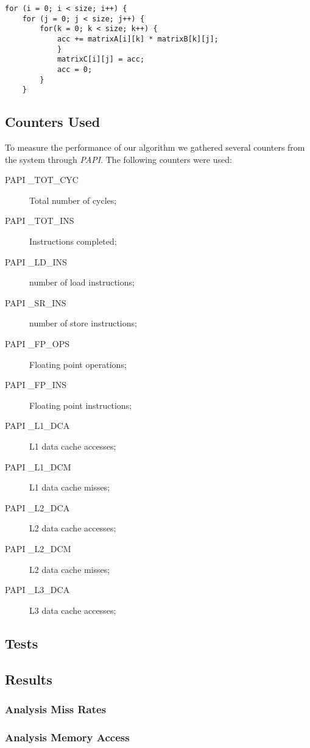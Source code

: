 \documentclass[a4paper,10pt,openright,openbib]{article}
\begin{document}
\begin{verbatim}
for (i = 0; i < size; i++) {
    for (j = 0; j < size; j++) {
        for(k = 0; k < size; k++) {
            acc += matrixA[i][k] * matrixB[k][j];				
            }		
            matrixC[i][j] = acc;	
            acc = 0;
        }
    }
\end{verbatim}

\subsection{Counters Used}
To measure the performance of our algorithm we gathered several counters from the system through \emph{PAPI}.
The following counters were used:
\begin{description}
\item[PAPI \_TOT\_CYC] Total number of cycles;
\item[PAPI \_TOT\_INS] Instructions completed;
\item[PAPI \_LD\_INS] number of load instructions;
\item[PAPI \_SR\_INS] number of store instructions;
\item[PAPI \_FP\_OPS] Floating point operations;
\item[PAPI \_FP\_INS] Floating point instructions;
\item[PAPI \_L1\_DCA] L1 data cache accesses;
\item[PAPI \_L1\_DCM] L1 data cache misses;
\item[PAPI \_L2\_DCA] L2 data cache accesses;
\item[PAPI \_L2\_DCM] L2 data cache misses;
\item[PAPI \_L3\_DCA] L3 data cache accesses;
\end{description}

\subsection{Tests}
\subsection{Results}
\subsubsection{Analysis Miss Rates}
\subsubsection{Analysis Memory Access}
\end{document}
